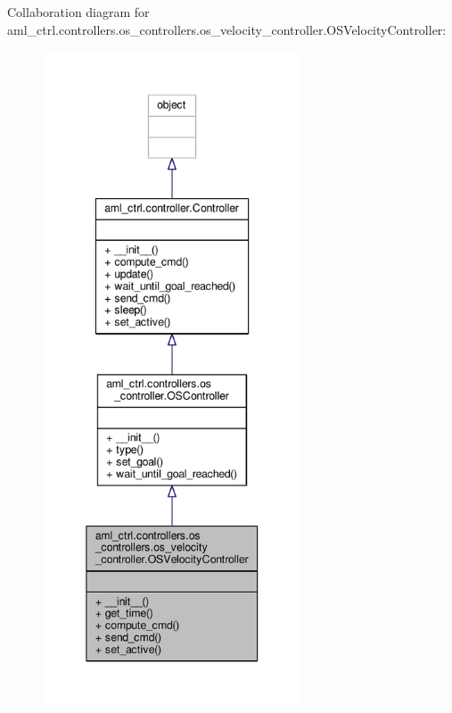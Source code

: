 Collaboration diagram for aml\-\_\-ctrl.\-controllers.\-os\-\_\-controllers.\-os\-\_\-velocity\-\_\-controller.\-O\-S\-Velocity\-Controller\-:\nopagebreak
\begin{figure}[H]
\begin{center}
\leavevmode
\includegraphics[height=550pt]{classaml__ctrl_1_1controllers_1_1os__controllers_1_1os__velocity__controller_1_1_o_s_velocity_controller__coll__graph}
\end{center}
\end{figure}
